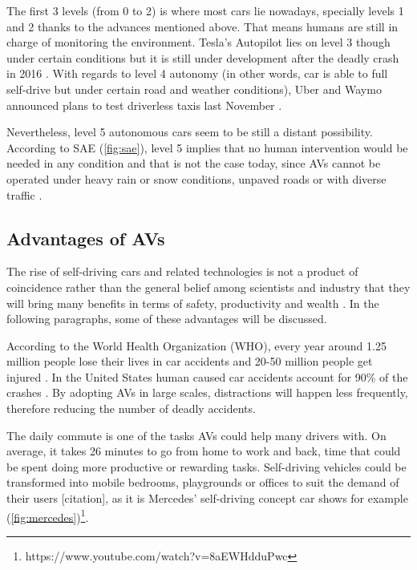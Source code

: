 The first 3 levels (from 0 to 2) is where most cars lie nowadays, specially levels 1 and 2 thanks to the advances mentioned above. That means humans are still in charge of monitoring the environment. Tesla's Autopilot lies on level 3 though under certain conditions but it is still under development after the deadly crash in 2016 . With regards to level 4 autonomy (in other words, car is able to full self-drive but under certain road and weather conditions), Uber and Waymo announced plans to test driverless taxis last November . 

Nevertheless, level 5 autonomous cars seem to be still a distant possibility. According to SAE (\autoref{fig:sae}), level 5 implies that no human intervention would be needed in any condition and that is not the case today, since AVs cannot be operated under heavy rain or snow conditions, unpaved roads or with diverse traffic .

\subsection{Advantages of AVs}

The rise of self-driving cars and related technologies is not a product of coincidence rather than the general belief among scientists and industry that they will bring many benefits in terms of safety, productivity and wealth . In the following paragraphs, some of these advantages will be discussed.

 According to the World Health Organization (WHO), every year around 1.25 million people lose their lives in car accidents and 20-50 million people get injured . In the United States human caused car accidents account for 90\% of the crashes . By adopting AVs in large scales, distractions will happen less frequently, therefore reducing the number of deadly accidents.

 The daily commute is one of the tasks AVs could help many drivers with. On average, it takes 26 minutes  to go from home to work and back, time that could be spent doing more productive or rewarding tasks. Self-driving vehicles could be transformed into mobile bedrooms, playgrounds or offices to suit the demand of their users [citation], as it is Mercedes' self-driving concept car shows for example (\autoref{fig:mercedes})\footnote{https://www.youtube.com/watch?v=8aEWHdduPwc}.

